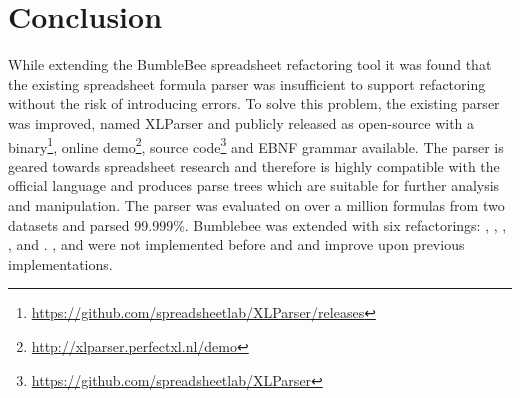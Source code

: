 
\chapter{Conclusion}
\label{chapter:conclusion}

While extending the BumbleBee spreadsheet refactoring tool it was found that the existing spreadsheet formula parser was insufficient to support refactoring without the risk of introducing errors.
To solve this problem, the existing parser was improved, named XLParser and publicly released as open-source with a binary\footnote{\url{https://github.com/spreadsheetlab/XLParser/releases}}, online demo\footnote{\url{http://xlparser.perfectxl.nl/demo}}, source code\footnote{\url{https://github.com/spreadsheetlab/XLParser}} and EBNF grammar available.
The parser is geared towards spreadsheet research and therefore is highly compatible with the official language and produces parse trees which are suitable for further analysis and manipulation.
The parser was evaluated on over a million formulas from two datasets and parsed 99.999\%.
Bumblebee was extended with six refactorings: , , , ,  and .
,  and  were not implemented before and  and  improve upon previous implementations.